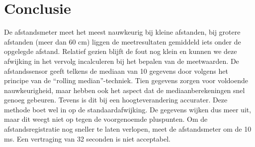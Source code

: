 \documentclass{peno-opdracht3}
\begin{document}
\section{Conclusie}
De afstandsmeter meet het meest nauwkeurig bij kleine afstanden, bij grotere afstanden (meer dan 60 cm) liggen de meetresultaten gemiddeld iets onder de opgelegde afstand. Relatief gezien blijft de fout nog klein en kunnen we deze afwijking in het vervolg incalculeren bij het bepalen van de meetwaarden. De afstandssensor geeft telkens de mediaan van 10 gegevens door volgens het principe van de “rolling median”-techniek. Tien gegevens zorgen voor voldoende nauwkeurigheid, maar hebben ook het aspect dat de mediaanberekeningen snel genoeg gebeuren. Tevens is dit bij een hoogteverandering accurater. Deze methode boet wel in op de standaardafwijking. De gegevens wijken dus meer uit, maar dit weegt niet op tegen de voorgenoemde pluspunten. Om de afstandsregistratie nog sneller te laten verlopen, meet de afstandsmeter om de 10 ms. Een vertraging van 32 seconden is niet acceptabel.
\end{document}
